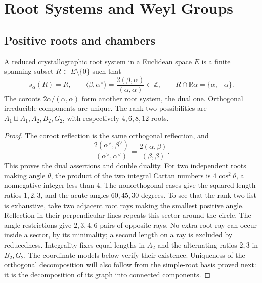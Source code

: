 \chapter{Root Systems and Weyl Groups}
\label{ch:root-systems}

\section{Positive roots and chambers}

\begin{definition}\label{res:E01}
A reduced crystallographic root system in a Euclidean space \(E\)
is a finite spanning subset \(R\subset E\setminus\{0\}\) such that
\[
 s_\alpha(R)=R,\qquad
 \langle\beta,\alpha^\vee\rangle
 =\frac{2(\beta,\alpha)}{(\alpha,\alpha)}\in\mathbb Z,\qquad
 R\cap\mathbb R\alpha=\{\alpha,-\alpha\}.
\]
The coroots \(2\alpha/(\alpha,\alpha)\) form another root system,
the dual one. Orthogonal irreducible components are unique.
The rank two possibilities are \(A_1\sqcup A_1,A_2,B_2,G_2\),
with respectively \(4,6,8,12\) roots.
\end{definition}
\begin{proof}
The coroot reflection is the same orthogonal reflection, and
\[
 \frac{2(\alpha^\vee,\beta^\vee)}
      {(\alpha^\vee,\alpha^\vee)}
 =\frac{2(\alpha,\beta)}{(\beta,\beta)}.
\]
This proves the dual assertions and double duality.
For two independent roots making angle \(\theta\),
the product of the two integral Cartan numbers is
\(4\cos^2\theta\), a nonnegative integer less than \(4\).
The nonorthogonal cases give the squared length ratios
\(1,2,3\), and the acute angles \(60,45,30\) degrees.
To see that the rank two list is exhaustive, take two adjacent
root rays making the smallest positive angle. Reflection in
their perpendicular lines repeats this sector around the
circle. The angle restrictions give \(2,3,4,6\) pairs of
opposite rays. No extra root ray can occur inside a sector,
by its minimality; a second length on a ray is excluded by
reducedness. Integrality fixes equal lengths in \(A_2\)
and the alternating ratios \(2,3\) in \(B_2,G_2\).
The coordinate models below verify their existence.
Uniqueness of the orthogonal decomposition will also follow
from the simple-root basis proved next: it is the decomposition
of its graph into connected components.
\end{proof}

